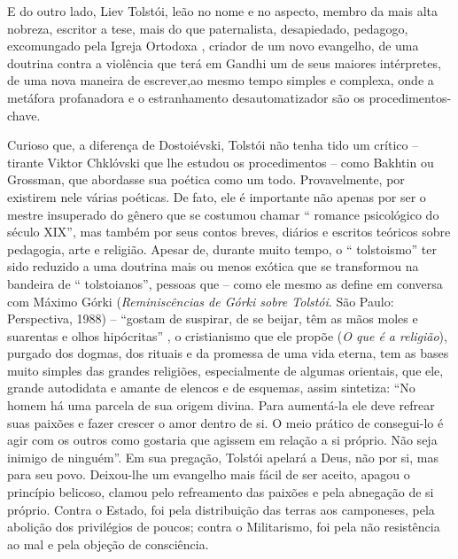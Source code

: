 E do outro lado, Liev Tolstói, leão no nome e no aspecto, membro da mais
alta nobreza, escritor a tese, mais do que paternalista, desapiedado,
pedagogo, excomungado pela Igreja Ortodoxa , criador de um novo
evangelho, de uma doutrina contra a violência que terá em Gandhi um de
seus maiores intérpretes, de uma nova maneira de escrever,ao mesmo tempo
simples e complexa, onde a metáfora profanadora e o estranhamento
desautomatizador são os procedimentos-chave.

Curioso que, a diferença de Dostoiévski, Tolstói não tenha tido um
crítico -- tirante Viktor Chklóvski que lhe estudou os procedimentos --
como Bakhtin ou Grossman, que abordasse sua poética como um todo.
Provavelmente, por existirem nele várias poéticas. De fato, ele é
importante não apenas por ser o mestre insuperado do gênero que se
costumou chamar `` romance psicológico do século XIX'', mas também por
seus contos breves, diários e escritos teóricos sobre pedagogia, arte e
religião. Apesar de, durante muito tempo, o `` tolstoismo'' ter sido
reduzido a uma doutrina mais ou menos exótica que se transformou na
bandeira de `` tolstoianos'', pessoas que -- como ele mesmo as define em
conversa com Máximo Górki (\emph{Reminiscências de Górki sobre Tolstói}.
São Paulo: Perspectiva, 1988) -- ``gostam de suspirar, de se beijar, têm
as mãos moles e suarentas e olhos hipócritas'' , o cristianismo que ele
propõe (\emph{O que é a religião}), purgado dos dogmas, dos rituais e da
promessa de uma vida eterna, tem as bases muito simples das grandes
religiões, especialmente de algumas orientais, que ele, grande
autodidata e amante de elencos e de esquemas, assim sintetiza: ``No
homem há uma parcela de sua origem divina. Para aumentá-la ele deve
refrear suas paixões e fazer crescer o amor dentro de si. O meio prático
de consegui-lo é agir com os outros como gostaria que agissem em relação
a si próprio. Não seja inimigo de ninguém''. Em sua pregação, Tolstói
apelará a Deus, não por si, mas para seu povo. Deixou-lhe um evangelho
mais fácil de ser aceito, apagou o princípio belicoso, clamou pelo
refreamento das paixões e pela abnegação de si próprio. Contra o Estado,
foi pela distribuição das terras aos camponeses, pela abolição dos
privilégios de poucos; contra o Militarismo, foi pela não resistência ao
mal e pela objeção de consciência.

